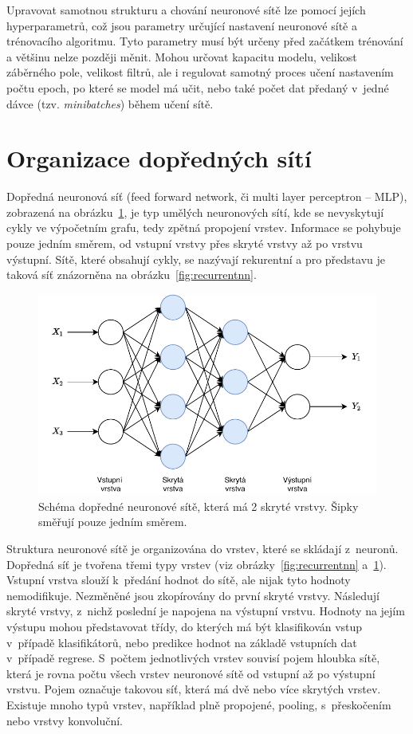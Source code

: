 Upravovat samotnou strukturu a chování neuronové sítě lze pomocí jejích hyperparametrů, což jsou parametry určující nastavení neuronové sítě a trénovacího algoritmu. Tyto parametry musí být určeny před začátkem trénování a většinu nelze později měnit. Mohou určovat kapacitu modelu, velikost záběrného pole, velikost filtrů, ale i regulovat samotný proces učení nastavením počtu epoch, po které se model má učit, nebo také počet dat předaný v~jedné dávce (tzv. \textit{minibatches}) během učení sítě.


\section{Organizace dopředných sítí}
Dopředná neuronová síť (feed forward network, či multi layer perceptron -- MLP), zobrazená na obrázku~\ref{fig:mlp}, je typ umělých neuronových sítí, kde se nevyskytují cykly ve výpočetním grafu, tedy zpětná propojení vrstev. Informace se pohybuje pouze jedním směrem, od vstupní vrstvy přes skryté vrstvy až po vrstvu výstupní. Sítě, které obsahují cykly, se nazývají rekurentní a pro představu je taková síť znázorněna na obrázku~\ref{fig:recurrentnn}.

\begin{figure}[H]
    \centering
    \includegraphics[scale=1.0]{obrazky-figures/mlp.pdf}
    \caption{\label{fig:mlp}Schéma dopředné neuronové sítě, která má 2 skryté vrstvy. Šipky směřují pouze jedním směrem.}
\end{figure}

Struktura neuronové sítě je organizována do vrstev, které se skládají z~neuronů. Dopředná síť je tvořena třemi typy vrstev (viz obrázky~\ref{fig:recurrentnn} a~\ref{fig:mlp}). Vstupní vrstva slouží k~předání hodnot do sítě, ale nijak tyto hodnoty nemodifikuje. Nezměněné jsou zkopírovány do první skryté vrstvy. Následují skryté vrstvy, z~nichž poslední je napojena na výstupní vrstvu. Hodnoty na jejím výstupu mohou představovat třídy, do kterých má být klasifikován vstup v~případě klasifikátorů, nebo predikce hodnot na základě vstupních dat v~případě regrese. S~počtem jednotlivých vrstev souvisí pojem hloubka sítě, která je rovna počtu všech vrstev neuronové sítě od vstupní až po výstupní vrstvu. Pojem  označuje takovou síť, která má dvě nebo více skrytých vrstev. Existuje mnoho typů vrstev, například plně propojené, pooling, s~přeskočením nebo vrstvy konvoluční.

